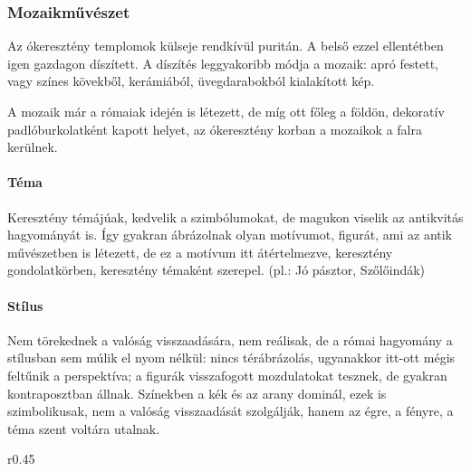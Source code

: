 		\begin{center}
		\end{center}
		
		
\subsubsection{Mozaikművészet}

	Az ókeresztény templomok külseje rendkívül puritán. A belső ezzel ellentétben igen gazdagon díszített. A díszítés leggyakoribb módja a mozaik: apró festett, vagy színes kövekből, kerámiából, üvegdarabokból kialakított kép.
	
	A mozaik már a rómaiak idején is létezett, de míg ott főleg a földön, dekoratív padlóburkolatként kapott helyet, az ókeresztény korban a mozaikok a falra kerülnek.

	\paragraph{Téma}
	Keresztény témájúak, kedvelik a szimbólumokat, de magukon viselik az antikvitás hagyományát is. Így gyakran ábrázolnak olyan motívumot, figurát, ami az antik művészetben is létezett, de ez a motívum itt átértelmezve, keresztény gondolatkörben, keresztény témaként szerepel. (pl.: Jó pásztor, Szőlőindák)
	
	\paragraph{Stílus}
	Nem törekednek a valóság visszaadására, nem reálisak, de a római hagyomány a stílusban sem múlik el nyom nélkül: nincs térábrázolás, ugyanakkor itt-ott mégis feltűnik a perspektíva; a figurák visszafogott mozdulatokat tesznek, de gyakran kontraposztban állnak. Színekben a kék és az arany dominál, ezek is szimbolikusak, nem a valóság visszaadását szolgálják, hanem az égre, a fényre, a téma szent voltára utalnak.
	
	\begin{wrapfigure}{r}{0.45\textwidth}
	\end{wrapfigure}
	

